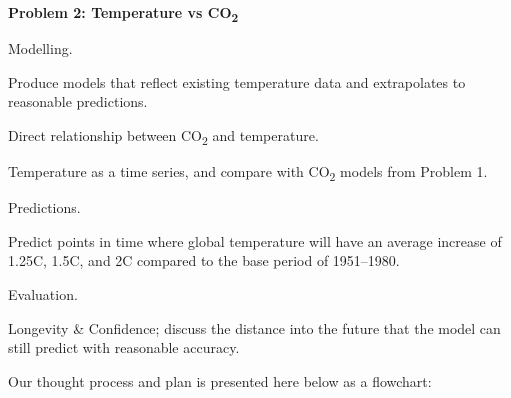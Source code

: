 \documentclass[12pt]{mcmthesis}
\begin{document}
    \noindent\textbf{Problem 2: Temperature vs CO\textsubscript{2}}

    \begin{adjustwidth}{1cm}{}

        \noindent Modelling.

        \vspace{-6pt}
        \noindent Produce models that reflect existing temperature data and extrapolates to reasonable predictions.

        \begin{adjustwidth}{1cm}{}
            \noindent Direct relationship between CO\textsubscript{2} and temperature.

            \noindent Temperature as a time series, and compare with CO\textsubscript{2} models from Problem 1.
        \end{adjustwidth}

        \noindent Predictions.

        \vspace{-6pt}
        \noindent Predict points in time where global temperature will have an average increase of 1.25\textdegree C, 1.5\textdegree C, and 2\textdegree C compared to the base period of 1951--1980.

        \noindent Evaluation.

        \vspace{-6pt}
        \noindent Longevity \& Confidence; discuss the distance into the future that the model can still predict with reasonable accuracy.


    \end{adjustwidth}

    \bigskip

    \noindent Our thought process and plan is presented here below as a flowchart:
    \begin{center}
    \end{center}
\end{document}
